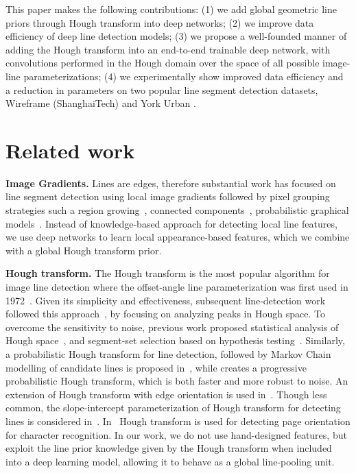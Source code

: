 \documentclass[runningheads]{llncs}
\begin{document}
This paper makes the following contributions:
(1) we add global geometric line priors through Hough transform into deep networks; 
(2) we improve data efficiency of deep line detection models;  
(3) we propose a well-founded manner of adding the Hough transform into an end-to-end trainable deep network, with convolutions performed in the Hough domain over the space of all possible image-line parameterizations; 
(4) we experimentally show improved data efficiency and a reduction in parameters on two popular line segment detection datasets, Wireframe (ShanghaiTech) \cite{huang2018learning} and York Urban \cite{denis2008efficient}.
 \section{Related work}

\textbf{Image Gradients.} Lines are edges, therefore substantial work has focused on line segment detection using local image gradients followed by pixel grouping strategies such a region growing~\cite{puatruaucean2012parameterless,von2008lsd}, connected components~\cite{burns1986extracting},  probabilistic graphical models~\cite{cho2017novel}. Instead of knowledge-based approach for detecting local line features, we use deep networks to learn local appearance-based features, which we combine with a global Hough transform prior.  

\textbf{Hough transform.} The Hough transform is the most popular algorithm for image line detection where the offset-angle line parameterization was first used in 1972~\cite{duda1972use}.
Given its simplicity and effectiveness, subsequent line-detection work followed this approach~\cite{furukawa2003accurate,kamat1998complete,xu2014accurate}, by focusing on analyzing peaks in Hough space.
To overcome the sensitivity to noise, previous work proposed statistical analysis of Hough space~\cite{xu2015statistical}, and segment-set selection based on hypothesis testing~\cite{von2008straight}.
Similarly, a probabilistic Hough transform for line detection, followed by Markov Chain modelling of candidate lines is proposed in~\cite{almazan2017mcmlsd}, while
\cite{matas2000robust} creates a progressive probabilistic Hough transform, which is both faster and more robust to noise.
An extension of Hough transform with edge orientation is used in~\cite{guerreiro2012connectivity}. 
Though less common, the slope-intercept parameterization of Hough transform for detecting lines is considered in~\cite{sheshkus2019houghnet}. 
In~\cite{nikolaev2008hough} Hough transform is used for detecting page orientation for character recognition. 
In our work, we do not use hand-designed features, but exploit the line prior knowledge given by the Hough transform when included into a deep learning model, allowing it to behave as a global line-pooling unit.  
\end{document}
